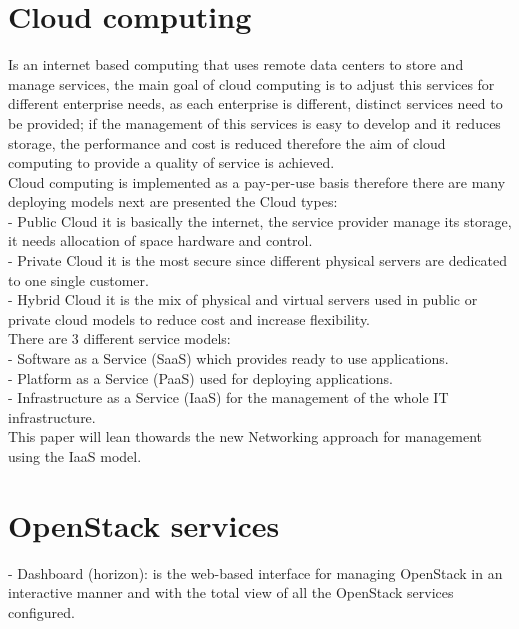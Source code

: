 \section{Cloud computing}
 
Is an internet based computing that uses remote data centers to store and manage services, the main goal of cloud computing is to adjust this services for different enterprise needs, as each enterprise is different, distinct services need to be provided; if the management of this services is easy to develop and it reduces storage, the performance and cost is reduced therefore the aim of cloud computing to provide a quality of service is achieved.\\
 
Cloud computing is implemented as a pay-per-use basis therefore there are many deploying models next are presented the Cloud types:\\
 
- Public Cloud it is basically the internet, the service provider manage its storage, it needs allocation of space hardware and control.\\

- Private Cloud it is the most secure since different physical servers are dedicated to one single customer.\\

- Hybrid Cloud it is the mix of physical and virtual servers used in public or private cloud models to reduce cost and increase flexibility.\\
 
There are 3 different service models:\\
 
- Software as a Service (SaaS) which provides ready to use applications.\\

- Platform as a Service (PaaS) used for deploying applications.\\

- Infrastructure as a Service (IaaS) for the management of the whole IT infrastructure.\\

This paper will lean thowards the new Networking approach for management using the IaaS model.
 
\section{OpenStack services}
 
- Dashboard (horizon): is the web-based interface for managing OpenStack in an interactive manner and with the total view of all the OpenStack services configured.\\


